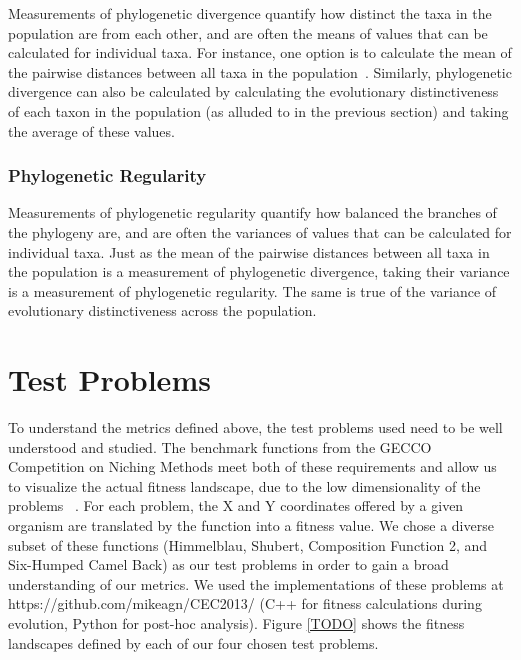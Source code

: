 \documentclass[letterpaper]{article}
\begin{document}
Measurements of phylogenetic divergence quantify how distinct the taxa in the population are from each other, and are often the means of values that can be calculated for individual taxa. For instance, one option is to calculate the mean of the pairwise distances between all taxa in the population~\citep{webb_exploring_2000}. Similarly, phylogenetic divergence can also be calculated by calculating the evolutionary distinctiveness of each taxon in the population (as alluded to in the previous section) and taking the average of these values.

\subsubsection{Phylogenetic Regularity}

Measurements of phylogenetic regularity quantify how balanced the branches of the phylogeny are, and are often the variances of values that can be calculated for individual taxa. Just as the mean of the pairwise distances between all taxa in the population is a measurement of phylogenetic divergence, taking their variance is a measurement of phylogenetic regularity. The same is true of the variance of evolutionary distinctiveness across the population.

\section{Test Problems}
To understand the metrics defined above, the test problems used need to be well understood and studied. The benchmark functions from the GECCO Competition on Niching Methods meet both of these requirements and allow us to visualize the actual fitness landscape, due to the low dimensionality of the problems ~\citep{li_benchmark_2013}. For each problem, the X and Y coordinates offered by a given organism are translated by the function into a fitness value. We chose a diverse subset of these functions (Himmelblau, Shubert, Composition Function 2, and Six-Humped Camel Back) as our test problems in order to gain a broad understanding of our metrics. We used the implementations of these problems at https://github.com/mikeagn/CEC2013/ (C++ for fitness calculations during evolution, Python for post-hoc analysis). Figure \ref{TODO} shows the fitness landscapes defined by each of our four chosen test problems. 
\end{document}
